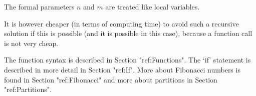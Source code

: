 The formal parameters $n$ and $m$ are treated like local variables.

It  is however  cheaper  (in  terms of  computing time)  to avoid such  a
recursive solution if this is possible (and it is possible in this case),
because a function call is not very cheap.

\null

The function  syntax is described  in Section "ref:Functions".   The `if'
statement is described  in more detail in  Section "ref:If".  More  about
Fibonacci  numbers is found  in  Section "ref:Fibonacci"  and more  about
partitions in Section "ref:Partitions".


